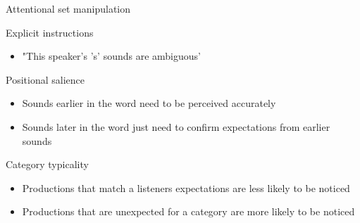 \documentclass{beamer}
\begin{document}
\begin{frame}{Attentional set manipulation}

Explicit instructions
\begin{itemize}
\item "This speaker's 's' sounds are ambiguous'
\end{itemize}

Positional salience
\begin{itemize}
\item Sounds earlier in the word need to be perceived accurately
\item Sounds later in the word just need to confirm expectations from earlier sounds
\end{itemize}

Category typicality
\begin{itemize}
\item Productions that match a listeners expectations are less likely to be noticed
\item Productions that are unexpected for a category are more likely to be noticed
\end{itemize}

\end{frame}
\end{document}
